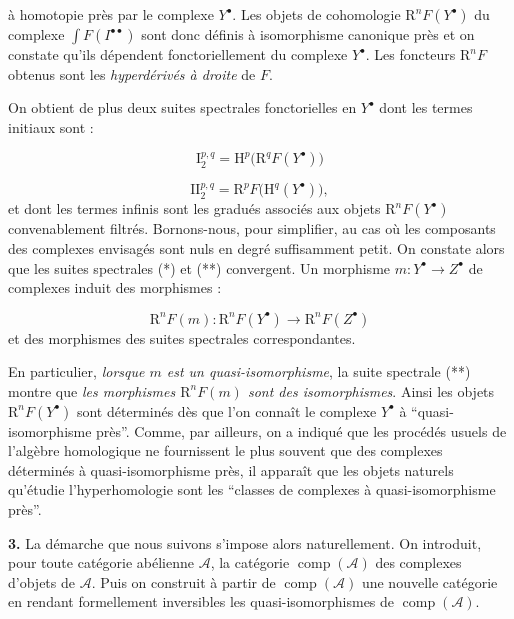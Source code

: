 %
à homotopie près par le complexe $Y^{\bullet}$. Les objets de cohomologie
$\mathrm R^nF(Y^{\bullet})$ du complexe
$\int F(I^{\bullet\bullet})$ sont donc définis à isomorphisme canonique près
et on constate qu'ils dépendent fonctoriellement du complexe $Y^{\bullet}$.
Les foncteurs $\mathrm R^nF$ obtenus sont les
\emph{hyperdérivés à droite} de $F$.

On obtient de plus deux suites spectrales fonctorielles en $Y^{\bullet}$ dont
les termes initiaux sont :

\begin{equation}
\mathrm I_2^{p,q}=\mathrm H^p\bigl(\mathrm R^qF(Y^{\bullet})\bigr)
\tag{*}
\end{equation}

\begin{equation}
\mathrm{II}_2^{p,q}=\mathrm R^pF\bigl(\mathrm H^q(Y^{\bullet})\bigr),
\tag{**}
\end{equation}
et dont les termes infinis sont les gradués associés aux objets
$\mathrm R^nF(Y^{\bullet})$ convenablement filtrés. Bornons-nous, pour
simplifier, au cas où les composants des complexes envisagés sont nuls en
degré suffisamment petit. On constate alors que les suites spectrales (*) et
(**) convergent. Un morphisme $m:Y^{\bullet}\to Z^{\bullet}$ de complexes
induit des morphismes :

\[
\mathrm R^nF(m):\mathrm R^nF(Y^{\bullet})
\longrightarrow \mathrm R^nF(Z^{\bullet})
\]
et des morphismes des suites spectrales correspondantes.

En particulier, \emph{lorsque $m$ est un quasi-isomorphisme}, la suite
spectrale (**) montre que \emph{les morphismes $\mathrm R^nF(m)$ sont des
isomorphismes}. Ainsi les objets $\mathrm R^nF(Y^{\bullet})$ sont déterminés
dès que l'on connaît le complexe $Y^{\bullet}$ à ``quasi-isomorphisme près''.
Comme, par ailleurs, on a indiqué que les procédés usuels de l'algèbre
homologique ne fournissent le plus souvent que des complexes déterminés à
quasi-isomorphisme près, il apparaît que les objets naturels qu'étudie
l'hyperhomologie sont les ``classes de complexes à quasi-isomorphisme près''.

\noindent\textbf{3.}\quad
La démarche que nous suivons s'impose alors naturellement. On introduit, pour
toute catégorie abélienne $\mathcal A$, la catégorie
$\operatorname{comp}(\mathcal A)$ des complexes d'objets de $\mathcal A$.
Puis on construit à partir de $\operatorname{comp}(\mathcal A)$ une nouvelle
catégorie en rendant formellement inversibles les quasi-isomorphismes de
$\operatorname{comp}(\mathcal A)$.

